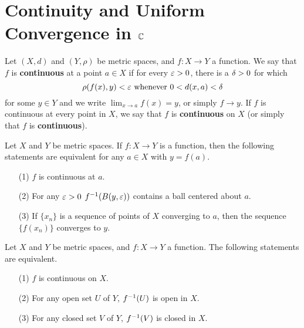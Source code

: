 \section{Continuity and Uniform Convergence in $\mathbb{C}$}

\begin{definition}
    Let $(X,d)$ and $(Y,\rho)$ be metric spaces, and $f:X \xrightarrow{} Y$ a
    function. We say that $f$ is \textbf{continuous} at a point $a \in X$ if for
    every  $\varepsilon>0$, there is a  $\delta>0$ for which
    \begin{equation*}
        \rho(f(x),y)<\varepsilon \text{ whenever } 0<d(x,a)<\delta
    \end{equation*}
    for some $y \in Y$ and we write $\lim_{x \xrightarrow{} a}{f(x)}=y$, or
    simply $f \xrightarrow{} y$. If $f$ is continuous at every point in  $X$, we
    say that  $f$ is  \textbf{continuous} on $X$  (or simply that $f$ is
    \textbf{continuous}).
\end{definition}

\begin{lemma}\label{2.5.1}
    Let $X$ and  $Y$ be metric spaces. If  $f:X \xrightarrow{} Y$ is a function,
    then the following statements are equivalent for any $a \in X$ with
    $y=f(a)$.
    \begin{enumerate}
        \item[(1)] $f$ is continuous at  $a$.

        \item[(2)] For any $\varepsilon>0$  $f^{-1}(B(y,\varepsilon))$ contains a ball centered
            about $a$.

        \item[(3)] If $\{x_n\}$ is a sequence of points of $X$ converging to
            $a$, then the sequence $\{f(x_n)\}$ converges to $y$.
    \end{enumerate}
\end{lemma}

\begin{lemma}\label{2.5.2}
    Let $X$ and  $Y$ be metric spaces, and  $f:X \xrightarrow{} Y$ a function.
    The following statements are equivalent.
    \begin{enumerate}
        \item[(1)] $f$ is continuous on  $X$.

        \item[(2)] For any open set $U$ of  $Y$,  $f^{-1}(U)$ is open in $X$.

        \item[(3)] For any closed set $V$ of  $Y$, $f^{-1}(V)$ is closed in
            $X$.
    \end{enumerate}
\end{lemma}

